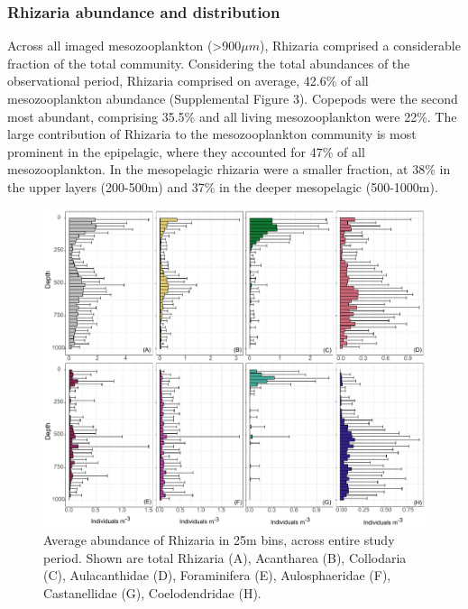 \documentclass[
]{article}
\begin{document}
\hypertarget{rhizaria-abundance-and-distribution}{%
\subsubsection{Rhizaria abundance and
distribution}\label{rhizaria-abundance-and-distribution}}

Across all imaged mesozooplankton (\textgreater900\(\mu m\)), Rhizaria
comprised a considerable fraction of the total community. Considering
the total abundances of the observational period, Rhizaria comprised on
average, 42.6\% of all mesozooplankton abundance (Supplemental Figure
3). Copepods were the second most abundant, comprising 35.5\% and all
living mesozooplankton were 22\%. The large contribution of Rhizaria to
the mesozooplankton community is most prominent in the epipelagic, where
they accounted for 47\% of all mesozooplankton. In the mesopelagic
rhizaria were a smaller fraction, at 38\% in the upper layers (200-500m)
and 37\% in the deeper mesopelagic (500-1000m).

\begin{figure}

{\centering \includegraphics{images/04_vertical.pdf}

}

\caption{Average abundance of Rhizaria in 25m bins, across entire study
period. Shown are total Rhizaria (A), Acantharea (B), Collodaria (C),
Aulacanthidae (D), Foraminifera (E), Aulosphaeridae (F), Castanellidae
(G), Coelodendridae (H).}

\end{figure}
\end{document}

